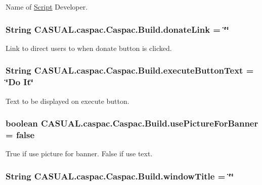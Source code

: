 Name of \hyperlink{class_c_a_s_u_a_l_1_1caspac_1_1_script}{Script} Developer. \hypertarget{class_c_a_s_u_a_l_1_1caspac_1_1_caspac_1_1_build_a7e5da9bd2b41e2f4351fe5f7512502f7}{
\subsubsection[{donate\-Link}]{\setlength{\rightskip}{0pt plus 5cm}String C\-A\-S\-U\-A\-L.\-caspac.\-Caspac.\-Build.\-donate\-Link = \char`\"{}\char`\"{}}}\label{class_c_a_s_u_a_l_1_1caspac_1_1_caspac_1_1_build_a7e5da9bd2b41e2f4351fe5f7512502f7}
Link to direct users to when donate button is clicked. \hypertarget{class_c_a_s_u_a_l_1_1caspac_1_1_caspac_1_1_build_a467591d36bbdbb5f6149a3faba1f34c2}{
\subsubsection[{execute\-Button\-Text}]{\setlength{\rightskip}{0pt plus 5cm}String C\-A\-S\-U\-A\-L.\-caspac.\-Caspac.\-Build.\-execute\-Button\-Text = \char`\"{}Do It\char`\"{}}}\label{class_c_a_s_u_a_l_1_1caspac_1_1_caspac_1_1_build_a467591d36bbdbb5f6149a3faba1f34c2}
Text to be displayed on execute button. \hypertarget{class_c_a_s_u_a_l_1_1caspac_1_1_caspac_1_1_build_ae3b7a0025376a2cd9a7a57455637aa2a}{
\subsubsection[{use\-Picture\-For\-Banner}]{\setlength{\rightskip}{0pt plus 5cm}boolean C\-A\-S\-U\-A\-L.\-caspac.\-Caspac.\-Build.\-use\-Picture\-For\-Banner = false}}\label{class_c_a_s_u_a_l_1_1caspac_1_1_caspac_1_1_build_ae3b7a0025376a2cd9a7a57455637aa2a}
True if use picture for banner. False if use text. \hypertarget{class_c_a_s_u_a_l_1_1caspac_1_1_caspac_1_1_build_aa6995cfb0460660802746dcc9629ca0d}{
\subsubsection[{window\-Title}]{\setlength{\rightskip}{0pt plus 5cm}String C\-A\-S\-U\-A\-L.\-caspac.\-Caspac.\-Build.\-window\-Title = \char`\"{}\char`\"{}}}\label{class_c_a_s_u_a_l_1_1caspac_1_1_caspac_1_1_build_aa6995cfb0460660802746dcc9629ca0d}
